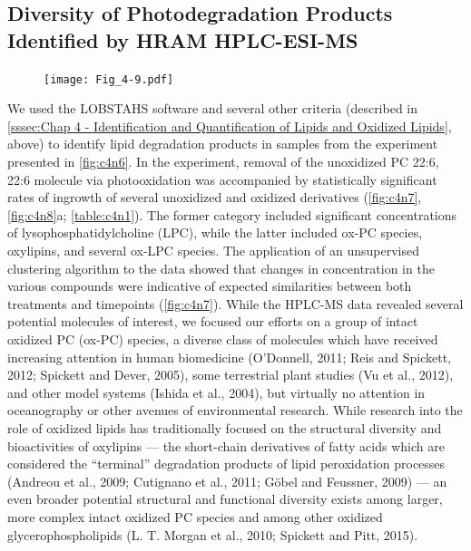\subsection{Diversity of Photodegradation Products Identified by HRAM HPLC-ESI-MS}
\begin{figure}[!ph]
\centering
\texttt{[image: Fig\_4-9.pdf]}
\end{figure}

We used the LOBSTAHS software and several other criteria (described in \autoref{sssec:Chap 4 - Identification and Quantification of Lipids and Oxidized Lipids}, above) to identify lipid degradation products in samples from the experiment presented in \autoref{fig:c4n6}. In the experiment, removal of the unoxidized PC 22:6, 22:6 molecule via photooxidation was accompanied by statistically significant rates of ingrowth of several unoxidized and oxidized derivatives (\autoref{fig:c4n7}, \autoref{fig:c4n8}a; \autoref{table:c4n1}). The former category included significant concentrations of lysophosphatidylcholine (LPC), while the latter included ox-PC species, oxylipins, and several ox-LPC species. The application of an unsupervised clustering algorithm to the data showed that changes in concentration in the various compounds were indicative of expected similarities between both treatments and timepoints (\autoref{fig:c4n7}). While the HPLC-MS data revealed several potential molecules of interest, we focused our efforts on a group of intact oxidized PC (ox-PC) species, a diverse class of molecules which have received increasing attention in human biomedicine (O'Donnell, 2011; Reis and Spickett, 2012; Spickett and Dever, 2005), some terrestrial plant studies (Vu et al., 2012), and other model systems (Ishida et al., 2004), but virtually no attention in oceanography or other avenues of environmental research. While research into the role of oxidized lipids has traditionally focused on the structural diversity and bioactivities of oxylipins --- the short-chain derivatives of fatty acids which are considered the ``terminal'' degradation products of lipid peroxidation processes (Andreou et al., 2009; Cutignano et al., 2011; G\"{o}bel and Feussner, 2009) --- an even broader potential structural and functional diversity exists among larger, more complex intact oxidized PC species and among other oxidized glycerophospholipids (L. T. Morgan et al., 2010; Spickett and Pitt, 2015).

